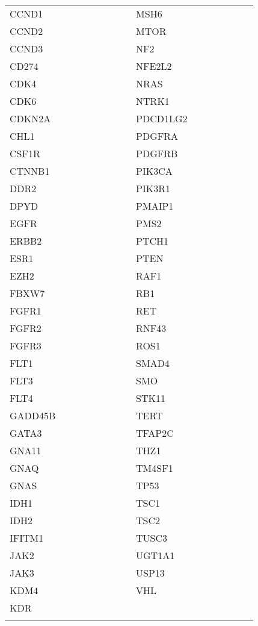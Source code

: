 \begin{table}
\begin{tabular}{|C{0.15\linewidth} | C{0.25\linewidth} | C{0.02\linewidth} | C{0.15\linewidth} | C{0.25\linewidth}|}
 CCND1 & &  & MSH6 & \\
 CCND2 & &  & MTOR & \\
 CCND3 & &  & NF2 & \\
 CD274 & &  & NFE2L2 & \\
 CDK4 & &  & NRAS & \\
 CDK6 & &  & NTRK1 & \\
 CDKN2A & &  & PDCD1LG2 & \\
 CHL1 & \textcite{Hoetzel2019} &  & PDGFRA & \\
 CSF1R & &  & PDGFRB & \\
 CTNNB1 & &  & PIK3CA & \\
 DDR2 & &  & PIK3R1 & \\
 DPYD & &  & PMAIP1 & \textcite{Do2019} \\
 EGFR & &  & PMS2 & \\
 ERBB2 & &  & PTCH1 & \\
 ESR1 & &  & PTEN & \\
 EZH2 & &  & RAF1 & \\
 FBXW7 & &  & RB1 & \\
 FGFR1 & &  & RET & \\
 FGFR2 & &  & RNF43 & \\
 FGFR3 & &  & ROS1 & \\
 FLT1 & &  & SMAD4 & \\
 FLT3 & &  & SMO & \\
 FLT4 & &  & STK11 & \\
 GADD45B & \textcite{Do2019} &  & TERT & \\
 GATA3 & &  & TFAP2C & \textcite{Do2019} \\
 GNA11 & &  & THZ1 & \textcite{Cheng2018} \\
 GNAQ & &  & TM4SF1 & \textcite{Ye2019} \\
 GNAS & &  & TP53 & \\
 IDH1 & &  & TSC1 & \\
 IDH2 & &  & TSC2 & \\
 IFITM1 & \textcite{Yang2018} &  & TUSC3 & \textcite{Feng2018a} \\
 JAK2 & &  & UGT1A1 & \\
 JAK3 & &  & USP13 & \textcite{Wu2019a} \\
 KDM4 & \textcite{Sun2020} &  & VHL & \\
 KDR & &  &  & \\
 \hhline{|-|-|~|-|-|}
\bottomrule
\end{tabular}
\end{table}